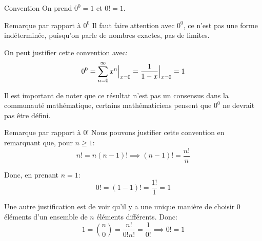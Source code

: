 \documentclass[a4paper]{article}
\begin{document}
\begin{parag}{Convention}
    On prend $0^0 = 1$ et $0! = 1$.

    \begin{subparag}{Remarque par rapport à $0^0$}
        Il faut faire attention avec $0^0$, ce n'est pas une forme indéterminée, puisqu'on parle de nombres exactes, pas de limites.

        On peut justifier cette convention avec: 
        \[0^0 = \sum_{n=0}^{\infty} x^n \Big|_{x = 0}^{} = \frac{1}{1 - x}\Big|_{x=0}^{} = 1\]

        Il est important de noter que ce résultat n'est pas un consensus dans la communauté mathématique, certains mathématiciens pensent que $0^0$ ne devrait pas être défini.
    \end{subparag}

    \begin{subparag}{Remarque par rapport à $0!$}
        Nous pouvons justifier cette convention en remarquant que, pour $n \geq 1$:
        \[n! = n\left(n-1\right)! \implies \left(n-1\right)! = \frac{n!}{n}\]
        
        Donc, en prenant $n = 1$: 
        \[0! = \left(1-1\right)! = \frac{1!}{1} = 1\]
        
        Une autre justification est de voir qu'il y a une unique manière de choisir 0 éléments d'un ensemble de $n$ éléments différents. Donc: 
        \[1 = \binom{n}{0} = \frac{n!}{0!n!} = \frac{1}{0!} \implies 0! = 1\]
    \end{subparag}
\end{parag}
\end{document}
